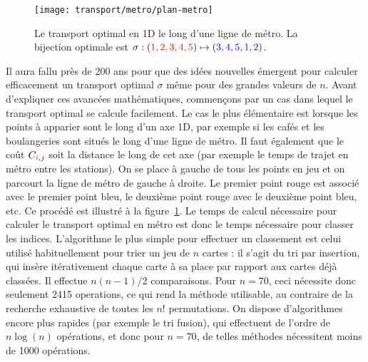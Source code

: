 \begin{figure}\centering
    \texttt{[image: transport/metro/plan-metro]}
    \caption{\label{fig:metro} Le transport optimal en 1D le long d'une ligne de métro. La bijection optimale est  
    $\sigma : ({\color{red}1,2,3,4,5}) \mapsto ({\color{blue}3,4,5,1,2})$. } 
\end{figure}



Il aura fallu près de 200 ans pour que des idées nouvelles émergent pour calculer efficacement un transport optimal $\sigma$ même pour des grandes valeurs de $n$. Avant d'expliquer ces avancées mathématiques, commençons par un cas dans lequel le transport optimal se calcule facilement.
%
Le cas le plus élémentaire est lorsque les points à apparier sont le long d'un axe 1D, par exemple si les cafés et les boulangeries sont situés le long d'une ligne de métro. Il faut également que le coût $C_{{\color{red}i},{\color{blue}j}}$ soit la distance le long de cet axe (par exemple le temps de trajet en métro entre les stations). 
%
On se place à gauche de tous les points en jeu et on parcourt la ligne de métro de gauche à droite. Le premier point rouge est associé avec le premier point bleu, le deuxième point rouge avec le deuxième point bleu, etc. 
%
%
Ce procédé est illustré à la figure~\ref{fig:metro}.  
%
Le temps de calcul nécessaire pour calculer le transport optimal en métro est donc le temps nécessaire pour classer les indices. L'algorithme le plus simple pour effectuer un classement est celui utilisé habituellement pour trier un jeu de $n$ cartes : il s'agit du tri par insertion, qui insère itérativement chaque carte à sa place par rapport aux cartes déjà classées. Il effectue $n(n-1)/2$ comparaisons. Pour $n=70$, ceci nécessite donc seulement 2415 operations, ce qui rend la méthode utilisable, au contraire de la recherche exhaustive de toutes les $n!$ permutations.
% 
On dispose d'algorithmes encore plus rapides (par exemple le tri fusion), qui effectuent de l'ordre de $n \log(n)$ opérations, et donc pour $n = 70$, de telles méthodes nécessitent moins de 1000 opérations. 

